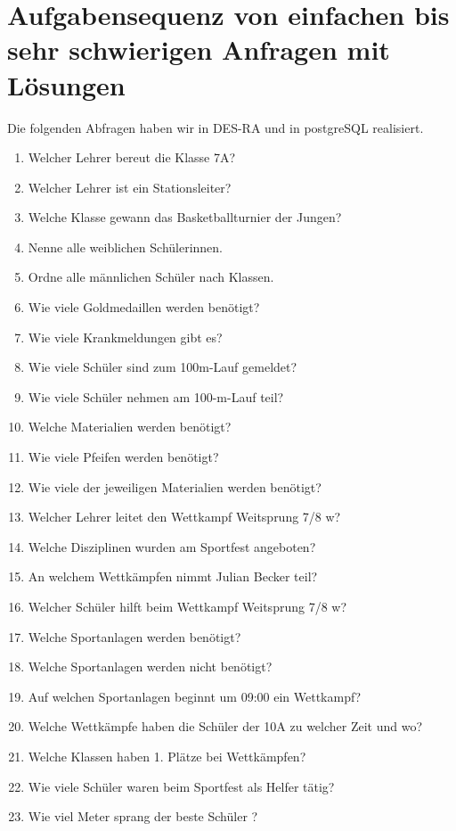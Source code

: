 \documentclass[pagesize,11pt,twoside]{scrartcl}
\begin{document}
\section{Aufgabensequenz von einfachen bis sehr schwierigen Anfragen mit Lösungen}
Die folgenden Abfragen haben wir in DES-RA und in postgreSQL realisiert.
\begin{enumerate}
 \item Welcher Lehrer bereut die Klasse 7A?
 
 \item Welcher Lehrer ist ein Stationsleiter?

 \item Welche Klasse gewann das Basketballturnier der Jungen?

 \item Nenne alle weiblichen Schülerinnen.
 \item Ordne alle männlichen Schüler nach Klassen.
 \item Wie viele Goldmedaillen werden benötigt?
 \item Wie viele Krankmeldungen gibt es?
 \item Wie viele Schüler sind zum 100m-Lauf gemeldet?
 \item Wie viele Schüler nehmen am 100-m-Lauf teil?
 \item Welche Materialien werden benötigt?
 \item Wie viele Pfeifen werden benötigt?
 \item Wie viele der jeweiligen Materialien werden benötigt?
 \item Welcher Lehrer leitet den Wettkampf Weitsprung 7/8 w?
 \item Welche Disziplinen wurden am Sportfest angeboten?
 \item An welchem Wettkämpfen nimmt Julian Becker teil?
 \item Welcher Schüler hilft beim Wettkampf Weitsprung 7/8 w?
 \item Welche Sportanlagen werden benötigt?
 \item Welche Sportanlagen werden nicht benötigt?
 \item Auf welchen Sportanlagen beginnt um 09:00 ein Wettkampf?
 \item Welche Wettkämpfe haben die Schüler der 10A zu welcher Zeit und wo?
 \item Welche Klassen haben 1. Plätze bei Wettkämpfen?
 \item Wie viele Schüler waren beim Sportfest als Helfer tätig?
 \item Wie viel Meter sprang der beste Schüler ?

\end{enumerate}
\end{document}
